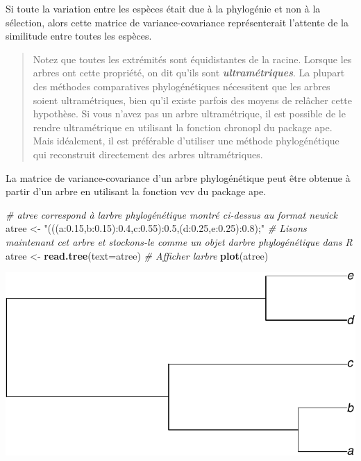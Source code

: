 \documentclass[
]{book}
\newenvironment{Shaded}{\begin{snugshade}}{\end{snugshade}}
\newcommand{\AttributeTok}[1]{\textcolor[rgb]{0.13,0.29,0.53}{#1}}
\newcommand{\CommentTok}[1]{\textcolor[rgb]{0.56,0.35,0.01}{\textit{#1}}}
\newcommand{\FunctionTok}[1]{\textcolor[rgb]{0.13,0.29,0.53}{\textbf{#1}}}
\newcommand{\NormalTok}[1]{#1}
\newcommand{\OtherTok}[1]{\textcolor[rgb]{0.56,0.35,0.01}{#1}}
\newcommand{\StringTok}[1]{\textcolor[rgb]{0.31,0.60,0.02}{#1}}
\begin{document}
Si toute la variation entre les espèces était due à la phylogénie et non à la sélection, alors cette matrice de variance-covariance représenterait l'attente de la similitude entre toutes les espèces.

\begin{quote}
Notez que toutes les extrémités sont équidistantes de la racine. Lorsque les arbres ont cette propriété, on dit qu'ils sont \textbf{\emph{ultramétriques}}. La plupart des méthodes comparatives phylogénétiques nécessitent que les arbres soient ultramétriques, bien qu'il existe parfois des moyens de relâcher cette hypothèse. Si vous n'avez pas un arbre ultramétrique, il est possible de le rendre ultramétrique en utilisant la fonction chronopl du package ape. Mais idéalement, il est préférable d'utiliser une méthode phylogénétique qui reconstruit directement des arbres ultramétriques.
\end{quote}

La matrice de variance-covariance d'un arbre phylogénétique peut être obtenue à partir d'un arbre en utilisant la fonction vcv du package ape.

\begin{Shaded}
\begin{Highlighting}[]
\CommentTok{\# \textquotesingle{}atree\textquotesingle{} correspond à l\textquotesingle{}arbre phylogénétique montré ci{-}dessus au format newick}
\NormalTok{atree }\OtherTok{\textless{}{-}} \StringTok{"(((a:0.15,b:0.15):0.4,c:0.55):0.5,(d:0.25,e:0.25):0.8);"}
\CommentTok{\# Lisons maintenant cet arbre et stockons{-}le comme un objet d\textquotesingle{}arbre phylogénétique dans R}
\NormalTok{atree }\OtherTok{\textless{}{-}} \FunctionTok{read.tree}\NormalTok{(}\AttributeTok{text=}\NormalTok{atree)}
\CommentTok{\# Afficher l\textquotesingle{}arbre}
\FunctionTok{plot}\NormalTok{(atree)}
\end{Highlighting}
\end{Shaded}

\includegraphics{pcm-workshop_files/figure-latex/vcv function-1.pdf}
\end{document}
